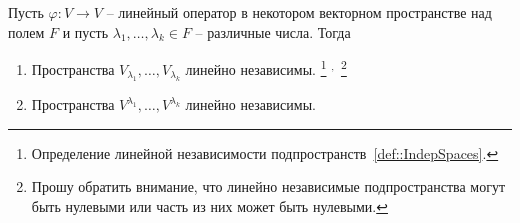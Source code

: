 \begin{claim}
\label{claim::EigenRootInd}
Пусть $\varphi\colon V\to V$ -- линейный оператор в некотором векторном пространстве над полем $F$ и пусть $\lambda_1,\ldots,\lambda_k\in F$ -- различные числа.
Тогда
\begin{enumerate}
\item Пространства $V_{\lambda_1},\ldots,V_{\lambda_k}$ линейно независимы.%
\footnote{Определение линейной независимости подпространств~\ref{def::IndepSpaces}.}%
${}^{,\,}$%
\footnote{Прошу обратить внимание, что линейно независимые подпространства могут быть нулевыми или часть из них может быть нулевыми.}

\item Пространства $V^{\lambda_1},\ldots,V^{\lambda_k}$ линейно независимы.
\end{enumerate}
\end{claim}
